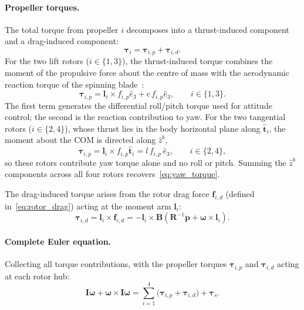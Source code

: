 \paragraph{Propeller torques.}
The total torque from propeller $i$ decomposes into a thrust-induced
component and a drag-induced component:
\begin{equation}
    \boldsymbol{\tau}_i = \boldsymbol{\tau}_{i,p} + \boldsymbol{\tau}_{i,d}.
    \label{eq:prop_torque_decomp}
\end{equation}
For the two lift rotors ($i \in \{1,3\}$), the thrust-induced torque combines
the moment of the propulsive force about the centre of mass with the
aerodynamic reaction torque of the spinning
blade~\cite{bai2022splitflyerair}:
\begin{equation}
    \boldsymbol{\tau}_{i,p}
        = \boldsymbol{l}_i \times f_{i,p}\hat{e}_3
          + c\,f_{i,p}\hat{e}_3,
    \qquad i \in \{1,3\}.
    \label{eq:tau_thrust}
\end{equation}
The first term generates the differential roll/pitch torque used for attitude
control; the second is the reaction contribution to yaw.  For the two
tangential rotors ($i \in \{2,4\}$), whose thrust lies in the body horizontal
plane along $\hat{\boldsymbol{t}}_i$, the moment about the COM is directed
along $\hat{z}^b$,
\begin{equation}
    \boldsymbol{\tau}_{i,p}
        = \boldsymbol{l}_i \times f_{i,p}\hat{\boldsymbol{t}}_i
        = l\,f_{i,p}\,\hat{e}_3,
    \qquad i \in \{2,4\},
    \label{eq:tau_tangential}
\end{equation}
so these rotors contribute yaw torque alone and no roll or pitch.  Summing the
$\hat{z}^b$ components across all four rotors recovers~\eqref{eq:yaw_torque}.

The drag-induced torque arises from the rotor drag force
$\boldsymbol{f}_{i,d}$ (defined in~\eqref{eq:rotor_drag}) acting at the
moment arm $\boldsymbol{l}_i$:
\begin{equation}
    \boldsymbol{\tau}_{i,d}
        = \boldsymbol{l}_i \times \boldsymbol{f}_{i,d}
        = -\boldsymbol{l}_i
            \times \boldsymbol{B}
            \!\left(\boldsymbol{R}^{-1}\dot{\boldsymbol{p}}
                  + \boldsymbol{\omega}\times\boldsymbol{l}_i\right).
    \label{eq:tau_drag}
\end{equation}

\paragraph{Complete Euler equation.}
Collecting all torque contributions, with the propeller torques
$\boldsymbol{\tau}_{i,p}$ and $\boldsymbol{\tau}_{i,d}$ acting at each
rotor hub:
\begin{equation}
    \boldsymbol{I}\dot{\boldsymbol{\omega}}
        + \boldsymbol{\omega}\times\boldsymbol{I}\boldsymbol{\omega}
        = \sum_{i=1}^{4}
            \bigl(\boldsymbol{\tau}_{i,p}
                  + \boldsymbol{\tau}_{i,d}\bigr)
          + \boldsymbol{\tau}_s.
    \label{eq:euler_full}
\end{equation}

